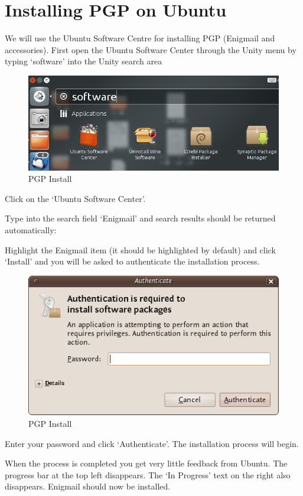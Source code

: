 \section{Installing PGP on Ubuntu}

We will use the Ubuntu Software Centre for installing PGP (Enigmail and
accessories). First open the Ubuntu Software Center through the Unity
menu by typing `software' into the Unity search area

\begin{figure}[htbp]
\centering
\includegraphics{pgp_ubuntu_inst_1.png}
\caption{PGP Install}
\end{figure}

Click on the `Ubuntu Software Center'.

Type into the search field `Enigmail' and search results should be
returned automatically:

Highlight the Enigmail item (it should be highlighted by default) and
click `Install' and you will be asked to authenticate the installation
process.

\begin{figure}[htbp]
\centering
\includegraphics{pgp_ubuntu_inst_2.png}
\caption{PGP Install}
\end{figure}

Enter your password and click `Authenticate'. The installation process
will begin.

When the process is completed you get very little feedback from Ubuntu.
The progress bar at the top left disappears. The `In Progress' text on
the right also disappears. Enigmail should now be installed.
